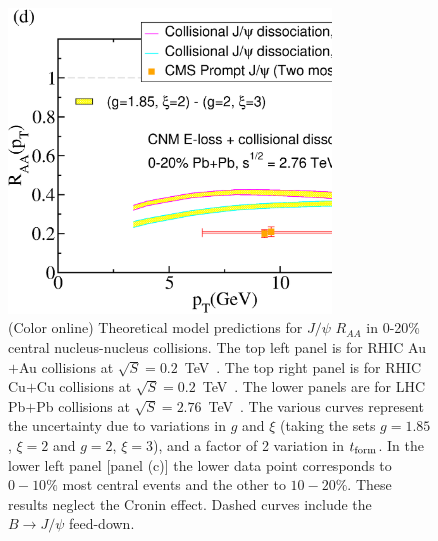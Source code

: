 \documentclass[article,showpacs,preprintnumbers,amsmath,amssymb]{revtex4}
\newcommand{\rf}{{\rm form}}
\begin{document}
\begin{figure}[!t]
\includegraphics[width=3.38in,angle=0]{fig9_lhc2760pbpbraa.eps}
\caption{(Color online) Theoretical model predictions for $J/\psi$ $R_{AA}$ in
0-20\% central  nucleus-nucleus collisions.  The top left panel is for RHIC Au$+$Au collisions at
$\sqrt{S}=0.2$~TeV~\cite{Tang:2011kr}. The top right panel is for RHIC Cu$+$Cu
collisions at $\sqrt{S}=0.2$~TeV~\cite{Abelev:2009qaa}. The lower  panels
are for LHC Pb$+$Pb collisions at $\sqrt{S}=2.76$~TeV~\cite{Chatrchyan:2012np,:2010px}. The
various curves represent the uncertainty due to variations in $g$ and $\xi$
(taking the sets $g=1.85$, $\xi=2$ and $g=2$, $\xi=3$), and a factor of 2
variation in $t_\rf$. In the lower left panel [panel (c)] the lower data 
point corresponds to $0-10\%$ most central events and the other to $10-20\%$. These results neglect the Cronin effect.
Dashed curves include the $B\rightarrow J/\psi$ feed-down. ~\label{fig:RAAJ1}}
\end{figure}
\end{document}
